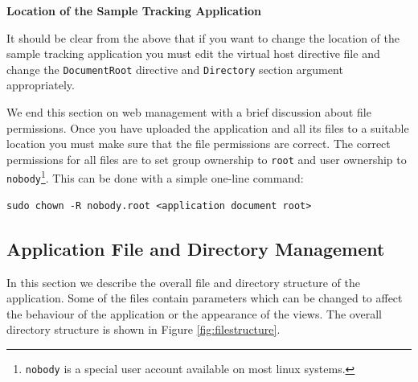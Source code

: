 \documentclass[12pt,twoside]{article}
\begin{document}
\begin{plainblock}
\begin{center}
\bfseries Location of the Sample Tracking Application
\end{center}
It should be clear from the above that if you want to change the
location of the sample tracking application you must edit the
virtual host directive file and change the \verb=DocumentRoot= directive
and \verb=Directory= section argument appropriately.
\end{plainblock}

We end this section on web management with a brief discussion about
file permissions. Once you have uploaded the application and all its
files to a suitable location you must make sure that the file permissions
are correct. The correct permissions for all files are to set group
ownership to \verb=root= and user ownership to \verb=nobody=\footnote{%
\texttt{nobody} is a special user account available on most linux
systems.}. This can be done with a simple one-line command:
\begin{verbatim}
sudo chown -R nobody.root <application document root>
\end{verbatim}

\subsection{Application File and Directory Management}
In this section we describe the overall file and directory structure
of the application. Some of the files contain parameters which can be
changed to affect the behaviour of the application or the appearance
of the views. The overall directory structure is shown in
Figure \ref{fig:filestructure}.
\end{document}
